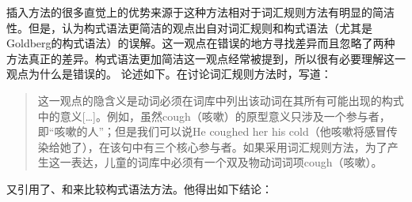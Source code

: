     插入方法的很多直觉上的优势来源于这种方法相对于词汇规则方法有明显的简洁性。但是，认为构式语法更简洁的观点出自对词汇规则和构式语法（尤其是Goldberg\citeyearpar{Goldberg95a,Goldberg2006a}的构式语法）的误解。这一观点在错误的地方寻找差异而且忽略了两种方法真正的差异。构式语法更加简洁这一观点经常被提到，所以很有必要理解这一观点为什么是错误的。
    \citet{Tomasello2003a}论述如下。在讨论词汇规则方法时，\citet[]{Tomasello2003a}写道：   

\begin{quote}
这一观点的隐含义是动词必须在词库中列出该动词在其所有可能出现的构式中的意义[\ldots]。例如，虽然cough（咳嗽）的原型意义只涉及一个参与者，即“咳嗽的人”；但是我们可以说He coughed her his cold（他咳嗽将感冒传染给她了），在该句中有三个核心参与者。如果采用词汇规则方法，为了产生这一表达，儿童的词库中必须有一个双及物动词词项cough（咳嗽）。\citep[]{Tomasello2003a}
\end{quote}
\citet[]{Tomasello2003a}又引用了\citet{FKoC88a}、\citet{Goldberg95a}和\citet{Croft2001a}来比较构式语法方法。他得出如下结论：

